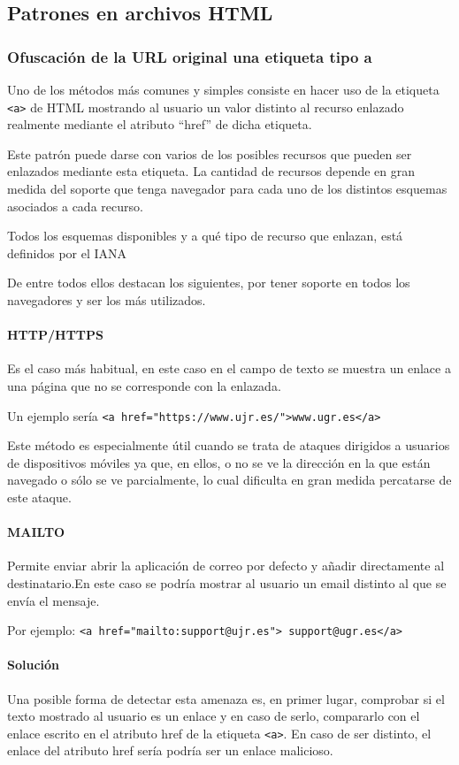 \subsection{Patrones en archivos HTML}
\subsubsection{Ofuscación de la URL original una etiqueta tipo a}
Uno de los métodos más comunes y simples consiste en hacer uso de la etiqueta \verb!<a>! de HTML mostrando al usuario un valor distinto al recurso enlazado realmente mediante el atributo “href” de dicha etiqueta. 

Este patrón puede darse con varios de los posibles recursos que pueden ser enlazados mediante esta etiqueta. La cantidad de recursos depende en gran medida del soporte que tenga navegador para cada uno de los distintos esquemas asociados a cada recurso.

Todos los esquemas disponibles y a qué tipo de recurso que enlazan, está definidos por el IANA \cite{Schemas_dispo}

De entre todos ellos destacan los siguientes, por tener soporte en todos los navegadores y ser los más utilizados.

\paragraph{HTTP/HTTPS}
Es el caso más habitual, en este caso en el campo de texto se muestra un enlace a una página que no se corresponde con la enlazada. 

Un ejemplo sería \verb|<a href="https://www.ujr.es/">www.ugr.es</a>|

Este método es especialmente útil cuando se trata de ataques dirigidos a usuarios de dispositivos móviles ya que, en ellos, o no se ve la dirección en la que están navegado o sólo se ve parcialmente, lo cual dificulta en gran medida percatarse de este ataque. 

\paragraph{MAILTO}
Permite enviar abrir la aplicación de correo por defecto y añadir directamente al destinatario.En este caso se podría mostrar al usuario un email distinto al que se envía el mensaje. 

Por ejemplo: \verb|<a href="mailto:support@ujr.es"> support@ugr.es</a>|

\paragraph{Solución}
Una posible forma de detectar esta amenaza es, en primer lugar, comprobar si el texto mostrado al usuario es un enlace y en caso de serlo, compararlo con el enlace escrito en el atributo href de la etiqueta \verb!<a>!. En caso de ser distinto, el enlace del atributo href sería podría ser un enlace malicioso. 

